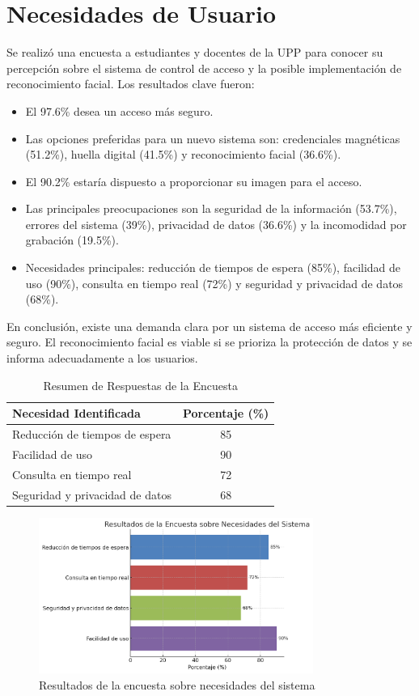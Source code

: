 \section{Necesidades de Usuario}

Se realizó una encuesta a estudiantes y docentes de la UPP para conocer su percepción sobre el sistema de control de acceso y la posible implementación de reconocimiento facial. Los resultados clave fueron:

\begin{itemize}
    \item El 97.6\% desea un acceso más seguro.
    \item Las opciones preferidas para un nuevo sistema son: credenciales magnéticas (51.2\%), huella digital (41.5\%) y reconocimiento facial (36.6\%).
    \item El 90.2\% estaría dispuesto a proporcionar su imagen para el acceso.
    \item Las principales preocupaciones son la seguridad de la información (53.7\%), errores del sistema (39\%), privacidad de datos (36.6\%) y la incomodidad por grabación (19.5\%).
    \item Necesidades principales: reducción de tiempos de espera (85\%), facilidad de uso (90\%), consulta en tiempo real (72\%) y seguridad y privacidad de datos (68\%).
\end{itemize}

En conclusión, existe una demanda clara por un sistema de acceso más eficiente y seguro. El reconocimiento facial es viable si se prioriza la protección de datos y se informa adecuadamente a los usuarios.

\begin{table}[H]
\centering
\caption{Resumen de Respuestas de la Encuesta}
\begin{tabular}{|p{6cm}|c|}
\hline
\rowcolor[HTML]{CFE2F3}\textbf{Necesidad Identificada} & \textbf{Porcentaje (\%)} \\
\hline
Reducción de tiempos de espera & 85 \\
Facilidad de uso & 90 \\
Consulta en tiempo real & 72 \\
Seguridad y privacidad de datos & 68 \\
\hline
\end{tabular}
\end{table}

\begin{figure}[H]
\centering
\includegraphics[width=0.8\textwidth]{./grafico_encuesta.png}
\caption{Resultados de la encuesta sobre necesidades del sistema}
\end{figure}